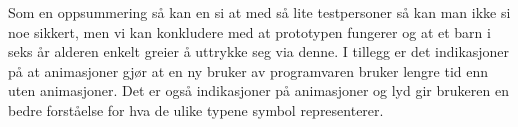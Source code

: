 Som en oppsummering så kan en si at med så lite testpersoner så kan man ikke si noe sikkert, men vi kan konkludere med at prototypen fungerer og at et barn i seks år alderen enkelt greier å uttrykke seg via denne. I tillegg er det indikasjoner på at animasjoner gjør at en ny bruker av programvaren bruker lengre tid enn uten animasjoner. Det er også indikasjoner på animasjoner og lyd gir brukeren en bedre forståelse for hva de ulike typene symbol representerer.  
 

 

 
 
 
 
 
 
 
 
 
 
 
 
